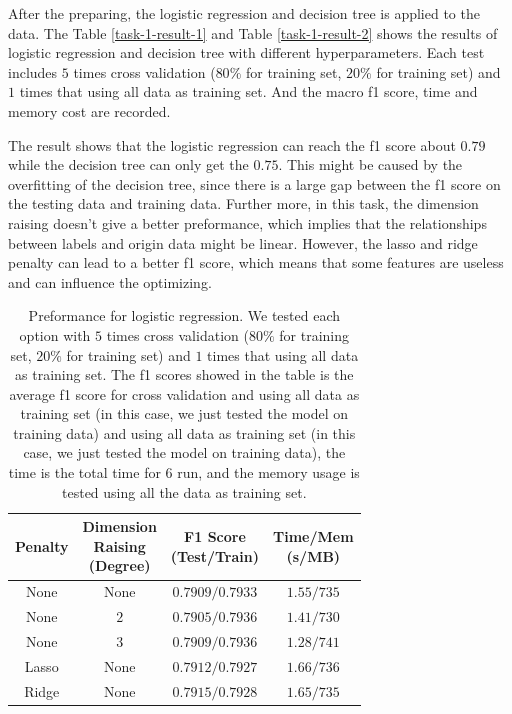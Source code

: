 \documentclass[11pt]{article}
\begin{document}
After the preparing, the logistic regression and decision tree is applied to the data. The Table \ref{task-1-result-1} and Table \ref{task-1-result-2} shows the results of logistic regression and decision tree with different hyperparameters. Each test includes $5$ times cross validation ($80\%$ for training set, $20\%$ for training set) and $1$ times that using all data as training set. And the macro f1 score, time and memory cost are recorded.

The result shows that the logistic regression can reach the f1 score about $0.79$ while the decision tree can only get the $0.75$. This might be caused by the overfitting of the decision tree, since there is a large gap between the f1 score on the testing data and training data. Further more, in this task, the dimension raising doesn't give a better preformance, which implies that the relationships between labels and origin data might be linear. However, the lasso and ridge penalty can lead to a better f1 score, which means that some features are useless and can influence the optimizing.

\begin{table}[H]
  \centering
  \begin{tabular}{|c|c|c|c|}
    \hline
    Penalty & \makecell{Dimension                                \\ Raising \\ (Degree)} & \makecell{F1 Score \\ (Test/Train)} & \makecell{Time/Mem \\ (s/MB)} \\
    \hline
    None    & None                & $0.7909/0.7933$ & $1.55/735$ \\
    \hline
    None    & $2$                 & $0.7905/0.7936$ & $1.41/730$ \\
    \hline
    None    & $3$                 & $0.7909/0.7936$ & $1.28/741$ \\
    \hline
    Lasso   & None                & $0.7912/0.7927$ & $1.66/736$ \\
    \hline
    Ridge   & None                & $0.7915/0.7928$ & $1.65/735$ \\
    \hline
  \end{tabular}
  \caption{Preformance for logistic regression. We tested each option with $5$ times cross validation ($80\%$ for training set, $20\%$ for training set) and $1$ times that using all data as training set. The f1 scores showed in the table is the average f1 score for cross validation and using all data as training set (in this case, we just tested the model on training data) and using all data as training set (in this case, we just tested the model on training data), the time is the total time for $6$ run, and the memory usage is tested using all the data as training set.}
\end{table}
\end{document}
